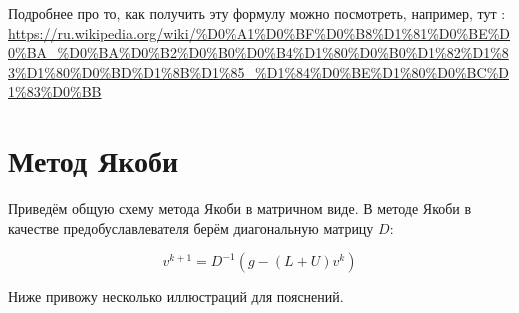 \documentclass[12pt]{article}
\begin{document}
Подробнее про то, как получить эту формулу можно посмотреть, например, тут :
\url{https://ru.wikipedia.org/wiki/%D0%A1%D0%BF%D0%B8%D1%81%D0%BE%D0%BA_%D0%BA%D0%B2%D0%B0%D0%B4%D1%80%D0%B0%D1%82%D1%83%D1%80%D0%BD%D1%8B%D1%85_%D1%84%D0%BE%D1%80%D0%BC%D1%83%D0%BB}

\section{Метод Якоби}

Приведём общую схему метода Якоби в матричном виде. В методе Якоби в качестве предобуславлевателя берём диагональную матрицу $D$:

\begin{equation}
v^{k+1} = D^{-1}(g - (L+U)v^k)
\end{equation}

Ниже привожу несколько иллюстраций для пояснений.

\begin{figure}[H]
\begin{minipage}[H]{0.59\linewidth}
\end{minipage}
\hfill
\begin{minipage}[H]{0.39\linewidth}
\end{minipage}
\end{figure} 
\end{document}
